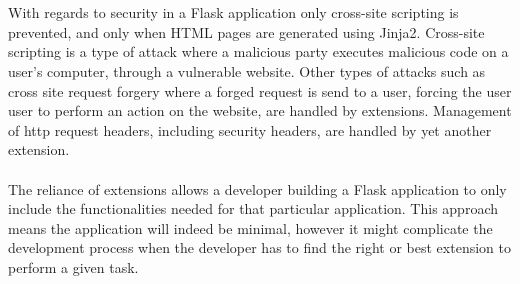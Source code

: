 \\\\
With regards to security in a Flask application \cite{Flask_security} only cross-site scripting is prevented, and only when HTML pages are generated using Jinja2. Cross-site scripting \cite{owasp_xss} is a type of attack where a malicious party executes malicious code on a user's computer, through a vulnerable website. Other types of attacks such as cross site request forgery \cite{owasp_csrf} where a forged request is send to a user, forcing the user user to perform an action on the website, are handled by extensions. Management of http request headers, including security headers, are handled by yet another extension.
\\\\
The reliance of extensions allows a developer building a Flask application to only include the functionalities needed for that particular application. This approach means the application will indeed be minimal, however it might complicate the development process when the developer has to find the right or best extension to perform a given task.

